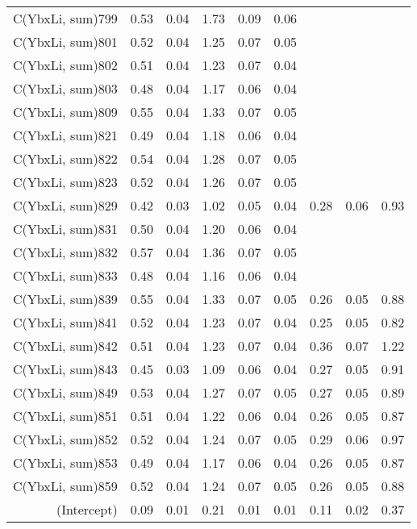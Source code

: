 \begin{table}[p]
\begin{tabular}{rrrrrrrrr}
  C(YbxLi, sum)799 & 0.53 & 0.04 & 1.73 & 0.09 & 0.06 &  &  &  \\ 
  C(YbxLi, sum)801 & 0.52 & 0.04 & 1.25 & 0.07 & 0.05 &  &  &  \\ 
  C(YbxLi, sum)802 & 0.51 & 0.04 & 1.23 & 0.07 & 0.04 &  &  &  \\ 
  C(YbxLi, sum)803 & 0.48 & 0.04 & 1.17 & 0.06 & 0.04 &  &  &  \\ 
  C(YbxLi, sum)809 & 0.55 & 0.04 & 1.33 & 0.07 & 0.05 &  &  &  \\ 
  C(YbxLi, sum)821 & 0.49 & 0.04 & 1.18 & 0.06 & 0.04 &  &  &  \\ 
  C(YbxLi, sum)822 & 0.54 & 0.04 & 1.28 & 0.07 & 0.05 &  &  &  \\ 
  C(YbxLi, sum)823 & 0.52 & 0.04 & 1.26 & 0.07 & 0.05 &  &  &  \\ 
  C(YbxLi, sum)829 & 0.42 & 0.03 & 1.02 & 0.05 & 0.04 & 0.28 & 0.06 & 0.93 \\ 
  C(YbxLi, sum)831 & 0.50 & 0.04 & 1.20 & 0.06 & 0.04 &  &  &  \\ 
  C(YbxLi, sum)832 & 0.57 & 0.04 & 1.36 & 0.07 & 0.05 &  &  &  \\ 
  C(YbxLi, sum)833 & 0.48 & 0.04 & 1.16 & 0.06 & 0.04 &  &  &  \\ 
  C(YbxLi, sum)839 & 0.55 & 0.04 & 1.33 & 0.07 & 0.05 & 0.26 & 0.05 & 0.88 \\ 
  C(YbxLi, sum)841 & 0.52 & 0.04 & 1.23 & 0.07 & 0.04 & 0.25 & 0.05 & 0.82 \\ 
  C(YbxLi, sum)842 & 0.51 & 0.04 & 1.23 & 0.07 & 0.04 & 0.36 & 0.07 & 1.22 \\ 
  C(YbxLi, sum)843 & 0.45 & 0.03 & 1.09 & 0.06 & 0.04 & 0.27 & 0.05 & 0.91 \\ 
  C(YbxLi, sum)849 & 0.53 & 0.04 & 1.27 & 0.07 & 0.05 & 0.27 & 0.05 & 0.89 \\ 
  C(YbxLi, sum)851 & 0.51 & 0.04 & 1.22 & 0.06 & 0.04 & 0.26 & 0.05 & 0.87 \\ 
  C(YbxLi, sum)852 & 0.52 & 0.04 & 1.24 & 0.07 & 0.05 & 0.29 & 0.06 & 0.97 \\ 
  C(YbxLi, sum)853 & 0.49 & 0.04 & 1.17 & 0.06 & 0.04 & 0.26 & 0.05 & 0.87 \\ 
  C(YbxLi, sum)859 & 0.52 & 0.04 & 1.24 & 0.07 & 0.05 & 0.26 & 0.05 & 0.88 \\ 
  (Intercept) & 0.09 & 0.01 & 0.21 & 0.01 & 0.01 & 0.11 & 0.02 & 0.37 \\ 
   \hline
\end{tabular}
\end{table}
